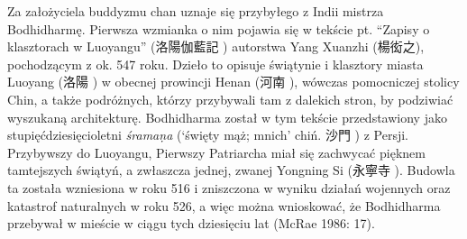 Za założyciela buddyzmu chan uznaje się przybyłego z Indii mistrza Bodhidharmę.
Pierwsza wzmianka o nim pojawia się w tekście pt. ``Zapisy o klasztorach w Luoyangu'' (洛陽伽藍記 ) autorstwa Yang Xuanzhi (楊衒之), pochodzącym z ok. 547 roku.
Dzieło to opisuje świątynie i klasztory miasta Luoyang (洛陽 ) w obecnej prowincji Henan (河南 ), wówczas pomocniczej stolicy Chin, a także podróżnych, którzy przybywali tam z dalekich stron, by podziwiać wyszukaną architekturę.
Bodhidharma został w tym tekście przedstawiony jako stupięćdziesięcioletni \textit{śrama\d{n}a} (`święty mąż; mnich' chiń. 沙門 ) z Persji.
Przybywszy do Luoyangu, Pierwszy Patriarcha miał się zachwycać pięknem tamtejszych świątyń, a zwłaszcza jednej, zwanej Yongning Si (永寧寺 ).
Budowla ta została wzniesiona w roku 516 i zniszczona w wyniku działań wojennych oraz katastrof naturalnych w roku 526, a więc można wnioskować, że Bodhidharma przebywał w mieście w ciągu tych dziesięciu lat
(McRae 1986: 17).

